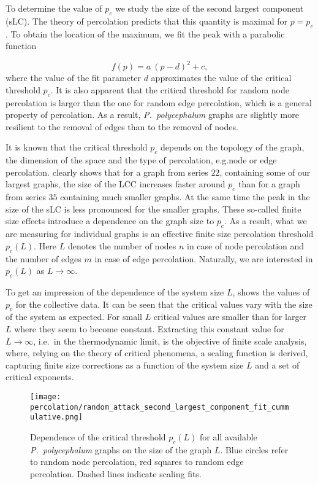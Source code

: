 		
		To determine the value of $p_c$ we study the size of the second largest component (sLC). The theory of percolation predicts that this quantity is maximal for $p=p_c$. To obtain the location of the maximum, we fit the peak with a parabolic function

		\begin{equation}
			f(p) = a \ (p-d)^2 + c,
		\end{equation}
		where the value of the fit parameter $d$ approximates the value of the critical threshold $p_c$. It is also apparent that the critical threshold for random node percolation is larger than the one for random edge percolation, which is a general property of percolation. As a result, \emph{P.~polycephalum} graphs are slightly more resilient to the removal of edges than to the removal of nodes.

		It is known that the critical threshold $p_c$ depends on the topology of the graph, the dimension of the space and the type of percolation, e.g.node or edge percolation.  clearly shows that for a graph from series $22$, containing some of our largest graphs, the size of the LCC increases faster around $p_c$ than for a graph from series $35$ containing much smaller graphs. At the same time the peak in the size of the sLC is less pronounced for the smaller graphs. These so-called finite size effects introduce a dependence on the graph size to $p_c$. As a result, what we are measuring for individual graphs is an effective finite size percolation threshold $p_c(L)$. Here $L$ denotes the number of nodes $n$ in case of node percolation and the number of edges $m$ in case of edge percolation. Naturally, we are interested in $p_c(L)$ as $L \to \infty$. 

		To get an impression of the dependence of the system size $L$,  shows the values of $p_c$ for the collective data. It can be seen that the critical values vary with the size of the system as expected. For small $L$ critical values are smaller than for larger $L$ where they seem to become constant. Extracting this constant value for $L \to \infty$, i.e.\ in the thermodynamic limit, is the objective of finite scale analysis, where, relying on the theory of critical phenomena, a scaling function is derived, capturing finite size corrections as a function of the system size $L$ and a set of critical exponents. 
		
		\begin{figure}[!htbp]
			\centering
				\texttt{[image: percolation/random\_attack\_second\_largest\_component\_fit\_cummulative.png]}
			\caption[Critical percolation thresholds.]{Dependence of the critical threshold $p_c(L)$ for all available \emph{P.~polycephalum} graphs on the size of the graph $L$. Blue circles refer to random node percolation, red squares to random edge percolation. Dashed lines indicate scaling fits.}
			\label{fig:percolation_scaling}
		\end{figure}


